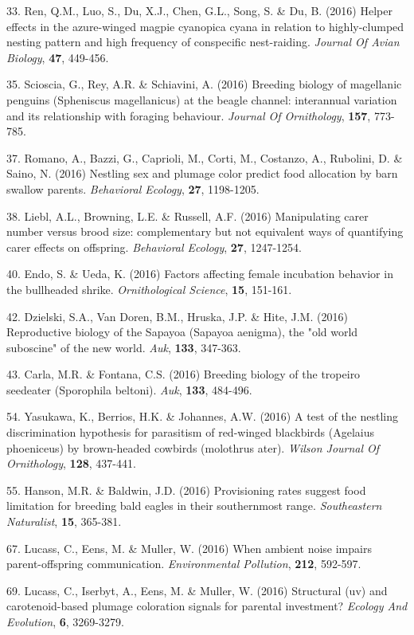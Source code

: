 33. Ren, Q.M., Luo, S., Du, X.J., Chen, G.L., Song, S. \&  Du, B. (2016) Helper effects in the azure-winged magpie cyanopica cyana in relation to highly-clumped nesting pattern and high frequency of conspecific nest-raiding. \textit{Journal Of Avian Biology},  \textbf{47}, 449-456.

35. Scioscia, G., Rey, A.R. \&  Schiavini, A. (2016) Breeding biology of magellanic penguins (Spheniscus magellanicus) at the beagle channel: interannual variation and its relationship with foraging behaviour. \textit{Journal Of Ornithology},  \textbf{157}, 773-785.

37. Romano, A., Bazzi, G., Caprioli, M., Corti, M., Costanzo, A., Rubolini, D. \&  Saino, N. (2016) Nestling sex and plumage color predict food allocation by barn swallow parents. \textit{Behavioral Ecology},  \textbf{27}, 1198-1205.

38. Liebl, A.L., Browning, L.E. \&  Russell, A.F. (2016) Manipulating carer number versus brood size: complementary but not equivalent ways of quantifying carer effects on offspring. \textit{Behavioral Ecology},  \textbf{27}, 1247-1254.

40. Endo, S. \&  Ueda, K. (2016) Factors affecting female incubation behavior in the bullheaded shrike. \textit{Ornithological Science},  \textbf{15}, 151-161.

42. Dzielski, S.A., Van Doren, B.M., Hruska, J.P. \&  Hite, J.M. (2016) Reproductive biology of the Sapayoa (Sapayoa aenigma), the "old world suboscine" of the new world. \textit{Auk},  \textbf{133}, 347-363.

43. Carla, M.R. \&  Fontana, C.S. (2016) Breeding biology of the tropeiro seedeater (Sporophila beltoni). \textit{Auk},  \textbf{133}, 484-496.

54. Yasukawa, K., Berrios, H.K. \&  Johannes, A.W. (2016) A test of the nestling discrimination hypothesis for parasitism of red-winged blackbirds (Agelaius phoeniceus) by brown-headed cowbirds (molothrus ater). \textit{Wilson Journal Of Ornithology},  \textbf{128}, 437-441.

55. Hanson, M.R. \&  Baldwin, J.D. (2016) Provisioning rates suggest food limitation for breeding bald eagles in their southernmost range. \textit{Southeastern Naturalist},  \textbf{15}, 365-381.

67. Lucass, C., Eens, M. \&  Muller, W. (2016) When ambient noise impairs parent-offspring communication. \textit{Environmental Pollution},  \textbf{212}, 592-597.

69. Lucass, C., Iserbyt, A., Eens, M. \&  Muller, W. (2016) Structural (uv) and carotenoid-based plumage coloration signals for parental investment? \textit{Ecology And Evolution},  \textbf{6}, 3269-3279.

